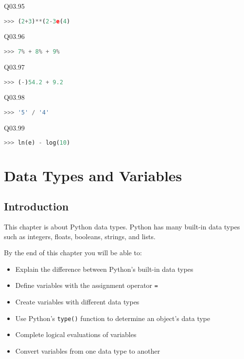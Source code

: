 \documentclass{book}
\newcommand{\passthrough}[1]{#1}
\begin{document}
Q03.95

\begin{lstlisting}[language=Python]
>>> (2+3)**(2-3e(4)
\end{lstlisting}

Q03.96

\begin{lstlisting}[language=Python]
>>> 7% + 8% + 9%
\end{lstlisting}

Q03.97

\begin{lstlisting}[language=Python]
>>> (-)54.2 + 9.2
\end{lstlisting}

Q03.98

\begin{lstlisting}[language=Python]
>>> '5' / '4'
\end{lstlisting}

Q03.99

\begin{lstlisting}[language=Python]
>>> ln(e) - log(10)
\end{lstlisting}
    




    
        \hypertarget{data-types-and-variables}{%
\chapter{Data Types and Variables}\label{data-types-and-variables}}
    




    
        \hypertarget{introduction}{%
\section{Introduction}\label{introduction}}
    




    
        This chapter is about Python data types. Python has many built-in data
types such as integers, floats, booleans, strings, and lists.

By the end of this chapter you will be able to:

\begin{itemize}
\item
  Explain the difference between Python's built-in data types
\item
  Define variables with the assignment operator
  \passthrough{\lstinline!=!}
\item
  Create variables with different data types
\item
  Use Python's \passthrough{\lstinline!type()!} function to determine an
  object's data type
\item
  Complete logical evaluations of variables
\item
  Convert variables from one data type to another
\end{itemize}
        \newpage
\end{document}

